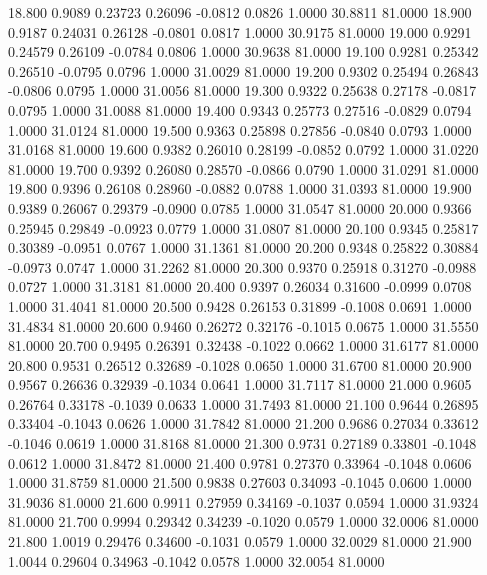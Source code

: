   18.800   0.9089   0.23723   0.26096  -0.0812   0.0826   1.0000  30.8811  81.0000
  18.900   0.9187   0.24031   0.26128  -0.0801   0.0817   1.0000  30.9175  81.0000
  19.000   0.9291   0.24579   0.26109  -0.0784   0.0806   1.0000  30.9638  81.0000
  19.100   0.9281   0.25342   0.26510  -0.0795   0.0796   1.0000  31.0029  81.0000
  19.200   0.9302   0.25494   0.26843  -0.0806   0.0795   1.0000  31.0056  81.0000
  19.300   0.9322   0.25638   0.27178  -0.0817   0.0795   1.0000  31.0088  81.0000
  19.400   0.9343   0.25773   0.27516  -0.0829   0.0794   1.0000  31.0124  81.0000
  19.500   0.9363   0.25898   0.27856  -0.0840   0.0793   1.0000  31.0168  81.0000
  19.600   0.9382   0.26010   0.28199  -0.0852   0.0792   1.0000  31.0220  81.0000
  19.700   0.9392   0.26080   0.28570  -0.0866   0.0790   1.0000  31.0291  81.0000
  19.800   0.9396   0.26108   0.28960  -0.0882   0.0788   1.0000  31.0393  81.0000
  19.900   0.9389   0.26067   0.29379  -0.0900   0.0785   1.0000  31.0547  81.0000
  20.000   0.9366   0.25945   0.29849  -0.0923   0.0779   1.0000  31.0807  81.0000
  20.100   0.9345   0.25817   0.30389  -0.0951   0.0767   1.0000  31.1361  81.0000
  20.200   0.9348   0.25822   0.30884  -0.0973   0.0747   1.0000  31.2262  81.0000
  20.300   0.9370   0.25918   0.31270  -0.0988   0.0727   1.0000  31.3181  81.0000
  20.400   0.9397   0.26034   0.31600  -0.0999   0.0708   1.0000  31.4041  81.0000
  20.500   0.9428   0.26153   0.31899  -0.1008   0.0691   1.0000  31.4834  81.0000
  20.600   0.9460   0.26272   0.32176  -0.1015   0.0675   1.0000  31.5550  81.0000
  20.700   0.9495   0.26391   0.32438  -0.1022   0.0662   1.0000  31.6177  81.0000
  20.800   0.9531   0.26512   0.32689  -0.1028   0.0650   1.0000  31.6700  81.0000
  20.900   0.9567   0.26636   0.32939  -0.1034   0.0641   1.0000  31.7117  81.0000
  21.000   0.9605   0.26764   0.33178  -0.1039   0.0633   1.0000  31.7493  81.0000
  21.100   0.9644   0.26895   0.33404  -0.1043   0.0626   1.0000  31.7842  81.0000
  21.200   0.9686   0.27034   0.33612  -0.1046   0.0619   1.0000  31.8168  81.0000
  21.300   0.9731   0.27189   0.33801  -0.1048   0.0612   1.0000  31.8472  81.0000
  21.400   0.9781   0.27370   0.33964  -0.1048   0.0606   1.0000  31.8759  81.0000
  21.500   0.9838   0.27603   0.34093  -0.1045   0.0600   1.0000  31.9036  81.0000
  21.600   0.9911   0.27959   0.34169  -0.1037   0.0594   1.0000  31.9324  81.0000
  21.700   0.9994   0.29342   0.34239  -0.1020   0.0579   1.0000  32.0006  81.0000
  21.800   1.0019   0.29476   0.34600  -0.1031   0.0579   1.0000  32.0029  81.0000
  21.900   1.0044   0.29604   0.34963  -0.1042   0.0578   1.0000  32.0054  81.0000
